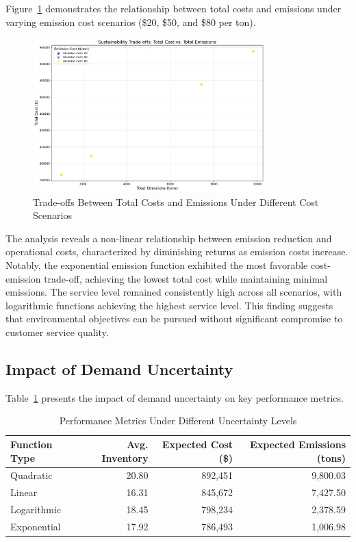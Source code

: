 Figure~\ref{fig:sustainability_tradeoffs} demonstrates the relationship between total costs and emissions under varying emission cost scenarios (\$20, \$50, and \$80 per ton).
\begin{figure}[htbp]
\centering
\includegraphics[width=0.8\textwidth]{images/sustainability_tradeoffs.pdf}
\caption{Trade-offs Between Total Costs and Emissions Under Different Cost Scenarios}
\label{fig:sustainability_tradeoffs}
\end{figure}

The analysis reveals a non-linear relationship between emission reduction and operational costs, characterized by diminishing returns as emission costs increase. Notably, the exponential emission function exhibited the most favorable cost-emission trade-off, achieving the lowest total cost while maintaining minimal emissions. The service level remained consistently high across all scenarios, with logarithmic functions achieving the highest service level. This finding suggests that environmental objectives can be pursued without significant compromise to customer service quality.

\subsection{Impact of Demand Uncertainty}
Table~\ref{tab:uncertainty} presents the impact of demand uncertainty on key performance metrics.

\begin{table}[htbp]
\centering
\caption{Performance Metrics Under Different Uncertainty Levels}
\label{tab:uncertainty}
\begin{tabular}{lrrr}
\hline
Function Type & Avg. Inventory & Expected Cost (\$) & Expected Emissions (tons) \\
\hline
Quadratic & 20.80 & 892,451 & 9,800.03 \\
Linear & 16.31 & 845,672 & 7,427.50 \\
Logarithmic & 18.45 & 798,234 & 2,378.59 \\
Exponential & 17.92 & 786,493 & 1,006.98 \\
\hline
\end{tabular}
\end{table}

